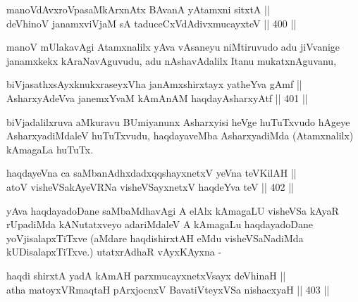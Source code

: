\begin{shl}
manoVdAvxroVpasaMkArxnAtx BAvanA yA\s \s tamxni sitxtA || \\
deVhinoV janamxviVjaM sA taduceCxVdAdivxmucayxteV \hfill || 400 ||  
\end{shl}

\begin{artha}
manoV mUlakavAgi Atamxnalilx yAva vAsaneyu niMtiruvudo adu jiVvanige
janamxkekx kAraNavAguvudu, adu nAshavAdalilx Itanu mukatxnAguvanu,
\end{artha}


\begin{shl}
biVjasathxsAyxknukxraseyxVha janAmx\s \s shirxtayx yatheYva gAmf || \\
\footnotemark[2]AsharxyAdeVva janemxYvaM kAmAnAM haqdayAsharxyAtf \hfill || 401 ||  
\end{shl}

\begin{artha}
biVjadalilxruva aMkuravu BUmiyanunx Asharxyisi heVge
huTuTxvudo hAgeye AsharxyadiMdaleV huTuTxvudu, haqdayaveMba
AsharxyadiMda (Atamxnalilx) kAmagaLa huTuTx.
\end{artha}


\begin{shl}
haqdayeVna ca saMbanAdhxdadxqqshayxnetxV yeVna teV\s KilAH || \\
atoV visheVSakAyeVRNa visheVSayxnetxV haqdeYva teV \hfill || 402 ||  
\end{shl}

\begin{artha}
yAva haqdayadoDane saMbaMdhavAgi A elAlx kAmagaLU visheVSa kAyaR
rUpadiMda kANutatxveyo adariMdaleV A kAmagaLu haqdayadoDane
yoVjisalapxTiTxve (aMdare haqdishirxtAH eMdu visheVSaNadiMda kUDisalapxTiTxve.) utatxrAdhaR vAyxKAyxna -
\end{artha}

\begin{shl}
haqdi shirxtA yadA kAmAH parxmucayxnetxV\s sayx deVhinaH || \\
atha matoyxVR\s maqtaH pArxjocnxV BavatiVteyxVSa nishacxyaH \hfill || 403 ||  
\end{shl}

